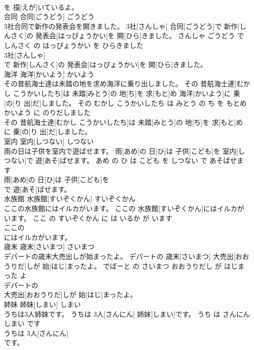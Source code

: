 \documentclass[8pt]{extreport}
\begin{document}
\begin{CJK}{UTF8}{min}
\\	を 描[えが]いているよ。			
\\	合同	合同[ごうどう]	ごうどう	
\\	3社合同で新作の発表会を開きました。	3社[さんしゃ] 合同[ごうどう]で 新作[しんさく]の 発表会[はっぴょうかい]を 開[ひら]きました。	さんしゃ ごうどう で しんさく の はっぴょうかい を ひらきました	
\\	3社[さんしゃ]
\\	で 新作[しんさく]の 発表会[はっぴょうかい]を 開[ひら]きました。			
\\	海洋	海洋[かいよう]	かいよう	
\\	その昔航海士達は未踏の地を求め海洋に乗り出しました。	その 昔航海士達[むかし こうかいしたち]は 未踏[みとう]の 地[ち]を 求[もと]め 海洋[かいよう]に 乗[の]り 出[だ]しました。	その むかし こうかいしたち は みとう の ち を もとめ かいよう に のりだしました	
\\	その 昔航海士達[むかし こうかいしたち]は 未踏[みとう]の 地[ち]を 求[もと]め
\\	に 乗[の]り 出[だ]しました。			
\\	室内	室内[しつない]	しつない	
\\	雨の日は子供を室内で遊ばせます。	雨[あめ]の 日[ひ]は 子供[こども]を 室内[しつない]で 遊[あそ]ばせます。	あめ の ひ は こども を しつない で あそばせます	
\\	雨[あめ]の 日[ひ]は 子供[こども]を
\\	で 遊[あそ]ばせます。			
\\	水族館	水族館[すいぞくかん]	すいぞくかん	
\\	ここの水族館にはイルカがいます。	ここの 水族館[すいぞくかん]にはイルカがいます。	ここ の すいぞくかん に は いるか が います	
\\	ここの
\\	にはイルカがいます。			
\\	歳末	歳末[さいまつ]	さいまつ	
\\	デパートの歳末大売出しが始まったよ。	デパートの 歳末[さいまつ] 大売出[おおうりだ]しが 始[はじ]まったよ。	でぱーと の さいまつ おおうりだし が はじまった よ	
\\	デパートの
\\	大売出[おおうりだ]しが 始[はじ]まったよ。			
\\	姉妹	姉妹[しまい]	しまい	
\\	うちは3人姉妹です。	うちは 3人[さんにん] 姉妹[しまい]です。	うち は さんにん しまい です	
\\	うちは 3人[さんにん]
\\	です。			

\end{CJK}
\end{document}
